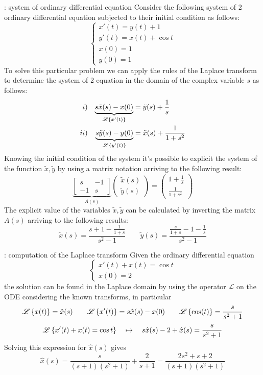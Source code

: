 	\begin{example}{: system of ordinary differential equation}
		Consider the following system of 2 ordinary differential equation subjected to their initial condition as follows:
		\[ \begin{cases}
			x'(t) = y(t) + 1 \\ y'(t) = x(t) + \cos t \\ x(0) = 1 \\ y(0) = 1
		\end{cases} \]
		To solve this particular problem we can apply the rules of the Laplace transform to determine the system of 2 equation in the domain of the complex variable $s$ as follows:
		\begin{align*}
			i)&&  \underbrace{s \tilde x(s) - x(0)}_{\mathscr{L} \left\{ x'(t) \right\}}&=\tilde y(s) + \frac 1 s \\
			ii)&&  \underbrace{s \tilde y(s) - y(0)}_{\mathscr{L} \left\{ y'(t) \right\}}&=\tilde x(s) + \frac 1 {1+s^2}
		\end{align*}
		Knowing the initial condition of the system it's possible to explicit the system of the function $\tilde x,\tilde y$ by using a matrix notation arriving to the following result:
		\[ \underbrace{\begin{bmatrix}
			s & -1 \\ -1 & s
		\end{bmatrix}}_{A(s)} \begin{pmatrix}
			\tilde x(s) \\ \tilde y(s)
		\end{pmatrix} = \begin{pmatrix}
			1 + \frac 1 s \\ \frac  1 {1+s^2}
		\end{pmatrix} \]
		The explicit value of the variables $\tilde x,\tilde y$ can be calculated by inverting the matrix $A(s)$ arriving to the following results:
		\[ \tilde x (s) = \frac{s+1 - \frac 1 {1+s}}{s^2-1} \qquad \tilde y(s) = \frac{\frac s {1+s} - 1  - \frac 1 s }{s^2-1} \]
		
	\end{example}
	
	\begin{example}{: computation of the Laplace transform}
		Given the ordinary differential equation\[ \begin{cases}
			x'(t) + x(t) = \cos t \\ x(0) = 2
		\end{cases} \]
		the solution can be found in the Laplace domain by using the operator $\mathscr L$ on the ODE considering the known transforms, in particular
		\[ \mathscr{L} \left\{ x(t) \right\} = \hat x(s) \qquad \mathscr{L} \left\{  x'(t) \right\} = s \hat x(s) - x(0) \qquad  \mathscr{L} \left\{ \cos(t) \right\} = \frac{s}{s^2+1}\]
		\[ \mathscr{L} \left\{ x'(t) + x(t) = \cos t \right\} \quad \mapsto \quad s\hat x(s) - 2 + \hat x(s) = \frac{s}{s^2+1} \]
		Solving this expression for $\hat x(s)$ gives
		\[ \hat x(s) = \frac{s}{(s+1)(s^2+1)} + \frac 2 {s+1} = \frac{2s^2+ s + 2}{(s+1)(s^2+1)}\]
	\end{example}
	
